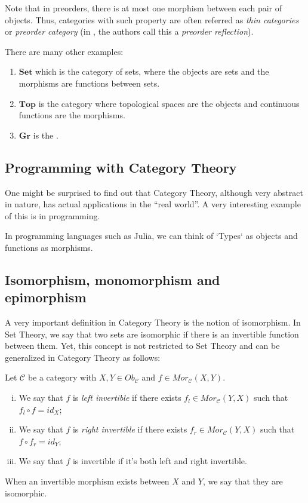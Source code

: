 Note that in preorders, there is at most one morphism between each pair of objects.
Thus, categories with such property are often referred as \textit{thin categories}
or \textit{preorder category} (in \citet{fong2019invitation}, the authors call this
a \textit{preorder reflection}).

There are many other examples:
\begin{enumerate}[1.]
  \item $\bm{Set}$ which is the category of sets, where the objects are sets and the morphisms are functions between sets.
  \item $\bm{Top}$ is the category where topological spaces are the objects and continuous functions are the morphisms.
  \item $\bm{Gr}$ is the  .
\end{enumerate}


\subsection{Programming with Category Theory}

One might be surprised to find out that Category Theory,
although very abstract in nature, has actual applications in the
``real world''. A very interesting example of this is in programming.

In programming languages such as Julia, we can think of `Types`
as objects and functions as morphisms.

\subsection{Isomorphism, monomorphism and epimorphism}

A very important definition in Category Theory is the notion of isomorphism.
In Set Theory, we say that two sets are isomorphic if there is an invertible
function between them. Yet, this concept is not restricted to Set Theory
and can be generalized in Category Theory as follows:

\begin{definition}
  Let $\mathcal C$ be a category with $X,Y \in Ob_\mathcal C$ and $f \in Mor_\mathcal C (X,Y)$.
  \begin{enumerate}[(i)]
    \item We say that $f$ is \textit{left invertible} if there exists $f_l \in Mor_\mathcal C (Y,X)$ such
      that $f_l \circ f = id_X$;
    \item We say that $f$ is \textit{right invertible} if there exists $f_r \in Mor_\mathcal C (Y,X)$ such
      that $f \circ f_r = id_Y$;
    \item We say that $f$ is invertible if it's both left and right invertible.
  \end{enumerate}
  When an invertible morphism exists between $X$ and $Y$, we say that they are isomorphic.
\end{definition}

